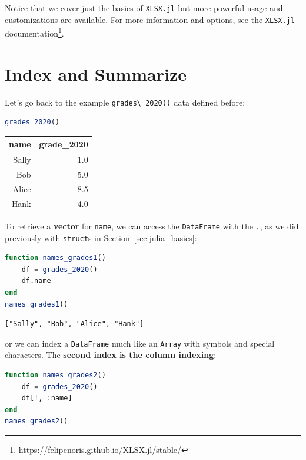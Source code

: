 \documentclass[
  notoc %
]{tufte-book}
\DeclareRobustCommand{\href}[2]{#2\footnote{\url{#1}}}
\newcommand{\passthrough}[1]{#1}
\begin{document}
Notice that we cover just the basics of
\passthrough{\lstinline!XLSX.jl!} but more powerful usage and
customizations are available. For more information and options, see the
\href{https://felipenoris.github.io/XLSX.jl/stable/}{\passthrough{\lstinline!XLSX.jl!}
documentation}.

\hypertarget{index-and-summarize}{%
\section{Index and Summarize}\label{index-and-summarize}}

Let's go back to the example \passthrough{\lstinline!grades\_2020()!}
data defined before:

\begin{lstlisting}[language=Julia]
grades_2020()
\end{lstlisting}

\begin{longtable}[]{@{}rr@{}}
\toprule
name & grade\_2020 \\
\midrule
\endhead
Sally & 1.0 \\
Bob & 5.0 \\
Alice & 8.5 \\
Hank & 4.0 \\
\bottomrule
\end{longtable}

To retrieve a \textbf{vector} for \passthrough{\lstinline!name!}, we can
access the \passthrough{\lstinline!DataFrame!} with the
\passthrough{\lstinline!.!}, as we did previously with
\passthrough{\lstinline!struct!}s in Section~\ref{sec:julia_basics}:

\begin{lstlisting}[language=Julia]
function names_grades1()
    df = grades_2020()
    df.name
end
names_grades1()
\end{lstlisting}

\begin{lstlisting}[language=Output]
["Sally", "Bob", "Alice", "Hank"]
\end{lstlisting}

or we can index a \passthrough{\lstinline!DataFrame!} much like an
\passthrough{\lstinline!Array!} with symbols and special characters. The
\textbf{second index is the column indexing}:

\begin{lstlisting}[language=Julia]
function names_grades2()
    df = grades_2020()
    df[!, :name]
end
names_grades2()
\end{lstlisting}
\end{document}
